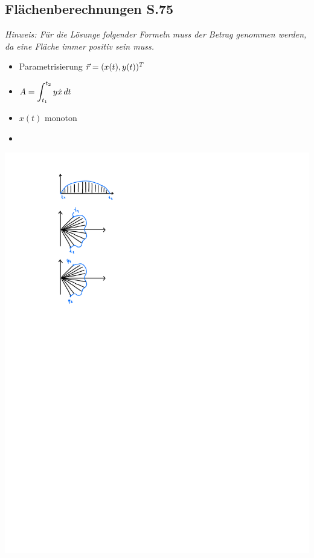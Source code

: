 \subsection{Flächenberechnungen \texorpdfstring{\hfill S.75}{S.75}}
    \textit{Hinweis: Für die Lösunge folgender Formeln muss der Betrag genommen werden, da eine Fläche immer positiv sein muss.}
    
    \vspace{0.5em}
    \begin{itemize}
        \item Parametrisierung $\vec{r}=(x(t),y(t))^T$ \hfill
    \end{itemize}
    \begin{minipage}{0.65\linewidth}
        \vspace{-1em}
        \begin{itemize}
        \item[]  $\displaystyle A= \int_{t_1}^{t_2} y \dot{x} \, dt$
        \item[] $x(t)$ monoton
        \item[]
        \end{itemize}
    \end{minipage}
    \begin{minipage}{0.34\linewidth}
        \includegraphics[width=0.7\linewidth]{src/Integralrechnung/param.pdf}
    \end{minipage}
